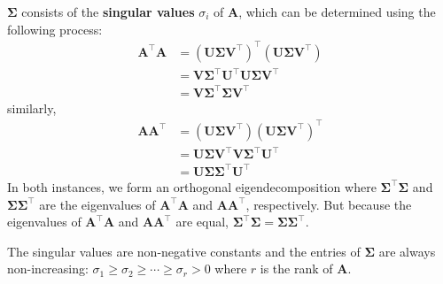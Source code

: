 \documentclass{article}
\begin{document}
\(\symbf{\Sigma}\) consists of the \textbf{singular values} \(\sigma_i\) of \(\symbf{A}\), which can be determined
using the following process:
\begin{align*}
    \symbf{A}^\top \symbf{A} & = \left( \symbf{U} \symbf{\Sigma} \symbf{V}^\top \right)^\top \left( \symbf{U} \symbf{\Sigma} \symbf{V}^\top \right) \\
                             & = \symbf{V} \symbf{\Sigma}^\top \symbf{U}^\top \symbf{U} \symbf{\Sigma} \symbf{V}^\top                               \\
                             & = \symbf{V} \symbf{\Sigma}^\top \symbf{\Sigma} \symbf{V}^\top
\end{align*}
similarly,
\begin{align*}
    \symbf{A} \symbf{A}^\top & = \left( \symbf{U} \symbf{\Sigma} \symbf{V}^\top \right) \left( \symbf{U} \symbf{\Sigma} \symbf{V}^\top \right)^\top \\
                             & = \symbf{U} \symbf{\Sigma} \symbf{V}^\top \symbf{V} \symbf{\Sigma}^\top \symbf{U}^\top                               \\
                             & = \symbf{U} \symbf{\Sigma} \symbf{\Sigma}^\top \symbf{U}^\top
\end{align*}
In both instances, we form an orthogonal eigendecomposition where
\(\symbf{\Sigma}^\top \symbf{\Sigma}\) and \(\symbf{\Sigma} \symbf{\Sigma}^\top\) are the eigenvalues of
\(\symbf{A}^\top\symbf{A}\) and \(\symbf{A}\symbf{A}^\top\), respectively.
But because the eigenvalues of \(\symbf{A}^\top\symbf{A}\) and \(\symbf{A}\symbf{A}^\top\)
are equal, \(\symbf{\Sigma}^\top \symbf{\Sigma} = \symbf{\Sigma} \symbf{\Sigma}^\top\).

The singular values are non-negative constants and the entries of \(\symbf{\Sigma}\)
are always non-increasing: \(\sigma_1 \geq \sigma_2 \geq \cdots \geq \sigma_r > 0\)
where \(r\) is the rank of \(\symbf{A}\).
\end{document}
